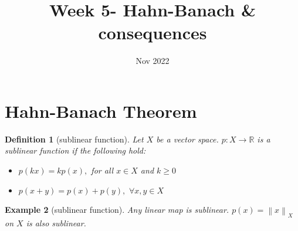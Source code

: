 \documentclass{article}
\title{Week 5- Hahn-Banach \& consequences}
\date{Nov 2022}
\newcommand{\nextline}{\hfill\break}
\newcommand{\norm}[1]{\left\|{#1}\right\|}
\newcommand{\func}[3]{${#1}:{#2}\xrightarrow{}{#3}$}
\newcommand{\real}{\mathbb{R}}
\newtheorem{example}{Example}[subsection]
\newtheorem{definition}[example]{Definition}
\begin{document}
\maketitle
\section{Hahn-Banach Theorem}
\begin{definition}[sublinear function]\rm\nextline
	Let $X$ be a vector space. \func{p}{X}{\real} is a sublinear function if the following hold:
	\begin{itemize}
		\item $p(kx)=kp(x),$ for all $x\in X$ and $k\geq0$
		\item $p(x+y)=p(x)+p(y),\,\,\forall x,y\in X$
	\end{itemize}
\end{definition}

\begin{example}[sublinear function]\rm\nextline
    Any linear map is sublinear. $p(x)=\norm{x}_X$ on $X$ is also sublinear.
\end{example}
\end{document}
